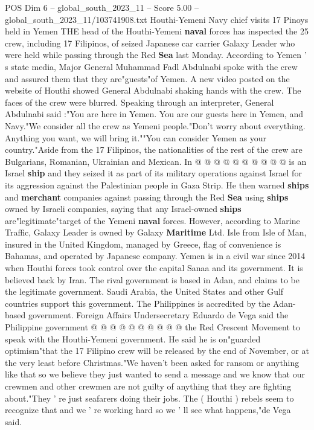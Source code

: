\begin{textsample}{POS Dim 6 – global\_south\_2023\_11 – Score 5.00 – global\_south\_2023\_11/103741908.txt}  \label{ex:f6_pos_258}
Houthi-Yemeni Navy chief visits 17 Pinoys held in Yemen THE head of the Houthi-Yemeni \textbf{naval} forces has inspected the 25 crew, including 17 Filipinos, of seized Japanese car carrier Galaxy Leader who were held while passing through the Red \textbf{Sea} last Monday.
According to Yemen ' s state media, Major General Muhammad Fadl Abdulnabi spoke with the crew and assured them that they are"guests"of Yemen.
A new video posted on the website of Houthi showed General Abdulnabi shaking hands with the crew.
The faces of the crew were blurred.
Speaking through an interpreter, General Abdulnabi said :"You are here in Yemen.
You are our guests here in Yemen, and Navy."We consider all the crew as Yemeni people."Don't worry about everything.
Anything you want, we will bring it.""You can consider Yemen as your country."Aside from the 17 Filipinos, the nationalities of the rest of the crew are Bulgarians, Romanian, Ukrainian and Mexican.
In @ @ @ @ @ @ @ @ @ @ is an Israel \textbf{ship} and they seized it as part of its military operations against Israel for its aggression against the Palestinian people in Gaza Strip.
He then warned \textbf{ships} and \textbf{merchant} companies against passing through the Red \textbf{Sea} using \textbf{ships} owned by Israeli companies, saying that any Israel-owned \textbf{ships} are"legitimate"target of the Yemeni \textbf{naval} forces.
However, according to Marine Traffic, Galaxy Leader is owned by Galaxy \textbf{Maritime} Ltd.
Isle from Isle of Man, insured in the United Kingdom, managed by Greece, flag of convenience is Bahamas, and operated by Japanese company.
Yemen is in a civil war since 2014 when Houthi forces took control over the capital Sanaa and its government.
It is believed back by Iran.
The rival government is based in Adan, and claims to be the legitimate government.
Saudi Arabia, the United States and other Gulf countries support this government.
The Philippines is accredited by the Adan-based government.
Foreign Affairs Undersecretary Eduardo de Vega said the Philippine government @ @ @ @ @ @ @ @ @ @ the Red Crescent Movement to speak with the Houthi-Yemeni government.
He said he is on"guarded optimism"that the 17 Filipino crew will be released by the end of November, or at the very least before Christmas."We haven't been asked for ransom or anything like that so we believe they just wanted to send a message and we know that our crewmen and other crewmen are not guilty of anything that they are fighting about."They ' re just seafarers doing their jobs.
The ( Houthi ) rebels seem to recognize that and we ' re working hard so we ' ll see what happens,"de Vega said.

\end{textsample}
